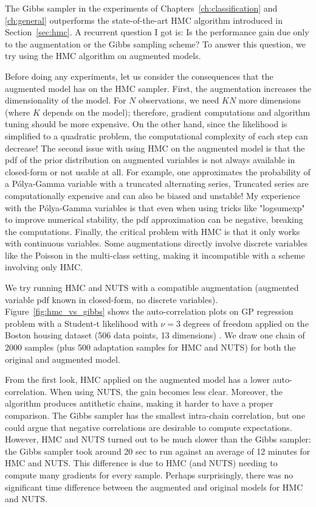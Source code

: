 The Gibbs sampler in the experiments of Chapters~\ref{ch:classification} and \ref{ch:general} outperforms the state-of-the-art \ac{HMC} algorithm introduced in Section~\ref{sec:hmc}.
A recurrent question I got is:
Is the performance gain due only to the augmentation or the Gibbs sampling scheme?
To answer this question, we try using the \ac{HMC} algorithm on augmented models.

Before doing any experiments, let us consider the consequences that the augmented model has on the \ac{HMC} sampler.
First, the augmentation increases the dimensionality of the model.
For $N$ observations, we need $KN$ more dimensions (where $K$ depends on the model); therefore, gradient computations and algorithm tuning should be more expensive.
On the other hand, since the likelihood is simplified to a quadratic problem, the computational complexity of each step can decrease!
The second issue with using \ac{HMC} on the augmented model is that the \ac{pdf} of the prior distribution on augmented variables is not always available in closed-form or not usable at all.
For example, one approximates the probability of a P\'olya-Gamma variable with a truncated alternating series,
Truncated series are computationally expensive and can also be biased and unstable!
My experience with the P\'olya-Gamma variables is that even when using tricks like "logsumexp" to improve numerical stability, the \ac{pdf} approximation can be negative, breaking the computations.
Finally, the critical problem with \ac{HMC} is that it only works with continuous variables.
Some augmentations directly involve discrete variables like the Poisson in the multi-class setting, making it incompatible with a scheme involving only \ac{HMC}.

We try running \ac{HMC} and \ac{NUTS} with a compatible augmentation (augmented variable \ac{pdf} known in closed-form, no discrete variables).
Figure~\ref{fig:hmc_vs_gibbs} shows the auto-correlation plots on \ac{GP} regression problem with a Student-t likelihood with $\nu=3$ degrees of freedom applied on the Boston housing dataset (506 data points, 13 dimensions) \cite{harrison1978hedonic}.
We draw one chain of 2000 samples (plus 500 adaptation samples for \ac{HMC} and \ac{NUTS}) for both the original and augmented model.

From the first look, \ac{HMC} applied on the augmented model has a lower auto-correlation.
When using \ac{NUTS}, the gain becomes less clear.
Moreover, the algorithm produces antithetic chains, making it harder to have a proper comparison.
The Gibbs sampler has the smallest intra-chain correlation, but one could argue that negative correlations are desirable to compute expectations.
However, \ac{HMC} and \ac{NUTS} turned out to be much slower than the Gibbs sampler:
the Gibbs sampler took around 20 sec to run against an average of 12 minutes for \ac{HMC} and \ac{NUTS}.
This difference is due to \ac{HMC} (and \ac{NUTS}) needing to compute many gradients for every sample.  
Perhaps surprisingly, there was no significant time difference between the augmented and original models for \ac{HMC} and \ac{NUTS}.

